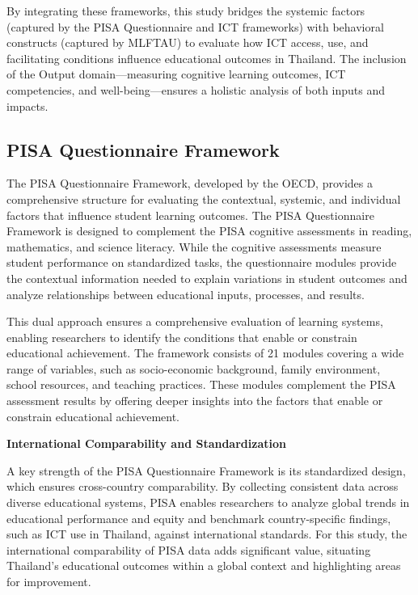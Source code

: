 \documentclass[
]{article}
\begin{document}
By integrating these frameworks, this study bridges the systemic factors
(captured by the PISA Questionnaire and ICT frameworks) with behavioral
constructs (captured by MLFTAU) to evaluate how ICT access, use, and
facilitating conditions influence educational outcomes in Thailand. The
inclusion of the Output domain---measuring cognitive learning outcomes,
ICT competencies, and well-being---ensures a holistic analysis of both
inputs and impacts.

\hypertarget{pisa-questionnaire-framework}{%
\subsection{PISA Questionnaire
Framework}\label{pisa-questionnaire-framework}}

The PISA Questionnaire Framework, developed by the OECD, provides a
comprehensive structure for evaluating the contextual, systemic, and
individual factors that influence student learning outcomes. The PISA
Questionnaire Framework is designed to complement the PISA cognitive
assessments in reading, mathematics, and science literacy. While the
cognitive assessments measure student performance on standardized tasks,
the questionnaire modules provide the contextual information needed to
explain variations in student outcomes and analyze relationships between
educational inputs, processes, and results.

This dual approach ensures a comprehensive evaluation of learning
systems, enabling researchers to identify the conditions that enable or
constrain educational achievement. The framework consists of 21 modules
covering a wide range of variables, such as socio-economic background,
family environment, school resources, and teaching practices. These
modules complement the PISA assessment results by offering deeper
insights into the factors that enable or constrain educational
achievement.

\textbf{International Comparability and Standardization}

A key strength of the PISA Questionnaire Framework is its standardized
design, which ensures cross-country comparability. By collecting
consistent data across diverse educational systems, PISA enables
researchers to analyze global trends in educational performance and
equity and benchmark country-specific findings, such as ICT use in
Thailand, against international standards. For this study, the
international comparability of PISA data adds significant value,
situating Thailand's educational outcomes within a global context and
highlighting areas for improvement.
\end{document}
